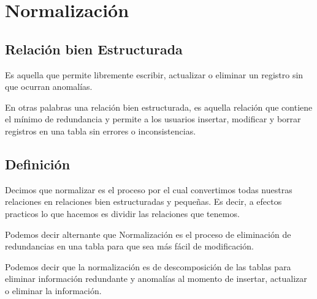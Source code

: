 \documentclass[12pt, fleqn]{report}                             %
\theoremstyle{break}                                            %
\begin{document}
        \clearpage
        \section{Normalización}


            \subsection{Relación bien Estructurada}

                Es aquella que permite libremente escribir, actualizar o eliminar un registro
                sin que ocurran anomalías.

                En otras palabras una relación bien estructurada, es aquella relación que
                contiene el mínimo de redundancia y permite a los usuarios insertar, modificar
                y borrar registros en una tabla sin errores o inconsistencias.


            \subsection{Definición}

                Decimos que normalizar es el proceso por el cual convertimos todas nuestras relaciones
                en relaciones bien estructuradas y pequeñas.
                Es decir, a efectos practicos lo que hacemos es dividir las relaciones que tenemos.

                Podemos decir alternante que Normalización es el proceso de eliminación de
                redundancias en una tabla para que sea más fácil de modificación.

                Podemos decir que la normalización es de descomposición de las tablas para eliminar
                información redundante y anomalías al momento de insertar, actualizar o eliminar la
                información.


\end{document}
